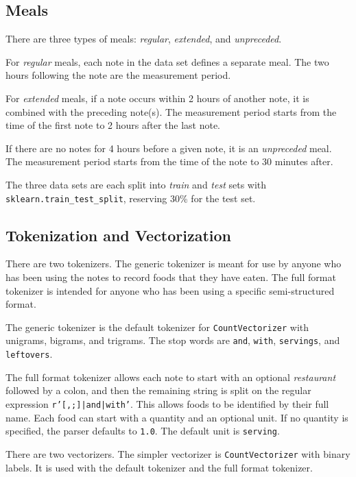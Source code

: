 \documentclass[conference]{IEEEtran}
\begin{document}
\subsection{Meals}

There are three types of meals: \emph{regular}, \emph{extended}, and \emph{unpreceded}.

For \emph{regular} meals, each note in the data set defines a separate meal. The two hours following the note are the measurement period.

For \emph{extended} meals, if a note occurs within 2 hours of another note, it is combined with the preceding note(s). The measurement period starts from the time of the first note to 2 hours after the last note.

If there are no notes for 4 hours before a given note, it is an \emph{unpreceded} meal. The measurement period starts from the time of the note to 30 minutes after.

The three data sets are each split into \emph{train} and \emph{test} sets with \texttt{sklearn.train\_test\_split}, reserving 30\% for the test set.

\subsection{Tokenization and Vectorization}

There are two tokenizers. The generic tokenizer is meant for use by anyone who has been using the notes to record foods that they have eaten. The full format tokenizer is intended for anyone who has been using a specific semi-structured format.

The generic tokenizer is the default tokenizer for \texttt{CountVectorizer} with unigrams, bigrams, and trigrams. The stop words are \texttt{and}, \texttt{with}, \texttt{servings}, and \texttt{leftovers}.

The full format tokenizer allows each note to start with an optional \emph{restaurant} followed by a colon, and then the remaining string is split on the regular expression \texttt{r'[,;]|and|with'}. This allows foods to be identified by their full name. Each food can start with a quantity and an optional unit. If no quantity is specified, the parser defaults to \texttt{1.0}. The default unit is \texttt{serving}.

There are two vectorizers. The simpler vectorizer is \texttt{CountVectorizer} with binary labels. It is used with the default tokenizer and the full format tokenizer.
\end{document}
